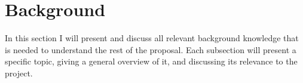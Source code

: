 \section{Background}
\label{sec:background}

In this section I will present and discuss all relevant background knowledge that is needed to understand the rest of the proposal.
Each subsection will present a specific topic, giving a general overview of it, and discussing its relevance to the project.





